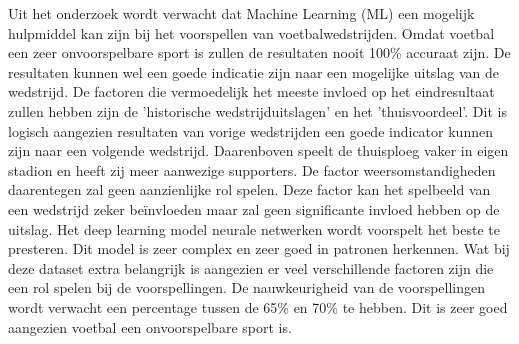 Uit het onderzoek wordt verwacht dat Machine Learning (ML) een mogelijk hulpmiddel kan zijn bij het voorspellen van voetbalwedstrijden. Omdat voetbal een zeer onvoorspelbare sport is zullen de resultaten nooit 100\% accuraat zijn. De resultaten kunnen wel een goede indicatie zijn naar een mogelijke uitslag van de wedstrijd.
De factoren die vermoedelijk het meeste invloed op het eindresultaat zullen hebben zijn de 'historische wedstrijduitslagen' en het 'thuisvoordeel'. Dit is logisch aangezien resultaten van vorige wedstrijden een goede indicator kunnen zijn naar een volgende wedstrijd. Daarenboven speelt de thuisploeg vaker in eigen stadion en heeft zij meer aanwezige supporters.
De factor weersomstandigheden daarentegen zal geen aanzienlijke rol spelen. Deze factor kan het spelbeeld van een wedstrijd zeker beïnvloeden maar zal geen significante invloed hebben op de uitslag.
Het deep learning model neurale netwerken wordt voorspelt het beste te presteren. Dit model is zeer complex en zeer goed in patronen herkennen. Wat bij deze dataset extra belangrijk is aangezien er veel verschillende factoren zijn die een rol spelen bij de voorspellingen.
De nauwkeurigheid van de voorspellingen wordt verwacht een percentage tussen de 65\% en 70\% te hebben. Dit is zeer goed aangezien voetbal een onvoorspelbare sport is. 
